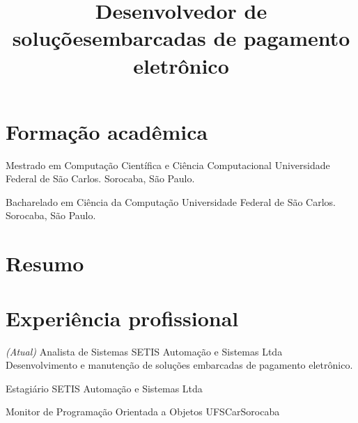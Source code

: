 \documentclass[11pt,a4paper,sans]{moderncv}
\title{\Large Desenvolvedor de soluções\newline embarcadas de pagamento eletrônico}
\begin{document}
\maketitle

\section{Formação acadêmica}

{Mestrado em Computação Científica e Ciência Computacional}
{}{}{}{Universidade Federal de São Carlos. Sorocaba, São Paulo.}

{Bacharelado em Ciência da Computação}
{}{}{}{Universidade Federal de São Carlos. Sorocaba, São Paulo.}

\section{Resumo}


\vspace{\baselineskip}


\vspace{\baselineskip}


\section{Experiência profissional}

{\textit{\small{(Atual)}} Analista de Sistemas}
{SETIS Automação e Sistemas Ltda}{}{}
{Desenvolvimento e manutenção de soluções embarcadas de pagamento eletrônico.}

{Estagiário}
{SETIS Automação e Sistemas Ltda}{}{}
{}

{Monitor de Programação Orientada a Objetos}
{UFSCar}{Sorocaba}{}
{}
\end{document}
